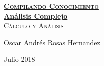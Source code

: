 \documentclass[12pt, fleqn]{report}                             %
\author{Oscar Andrés Rosas}                                     %
\theoremstyle{break}                                            %
\begin{document}
\begin{titlepage}
    
    \pagecolor{TitlePageColor}                                      %
    \color{white}                                                   %

    \vspace                                                         %
    \baselineskip                                                   %

    \makebox[0pt][l]{\rule{1.3\textwidth}{3pt}}                     %
    
    \href{https://compilandoconocimiento.com}                       %
    {\textbf{\textsc{\Huge Compilando Conocimiento}}}\\[2.7cm]      %

    \href{\ProjectNameLink}                                         %
    {\fontsize{45}{52}\selectfont \textbf{Análisis Complejo}}\\[0.5cm] %
    \textcolor{ColorSubtext}{\textsc{\Huge Cálculo y Análisis}}     %
    
    \vfill                                                          %
    
    \href{\ProjectAuthorLink}                                       %
    {\LARGE \textsf{Oscar Andrés Rosas Hernandez}}                  %

    \vspace                                                         %
    \baselineskip                                                   %
    
    {\large \textsf{Julio 2018}}                                    %

\end{titlepage}
\end{document}
